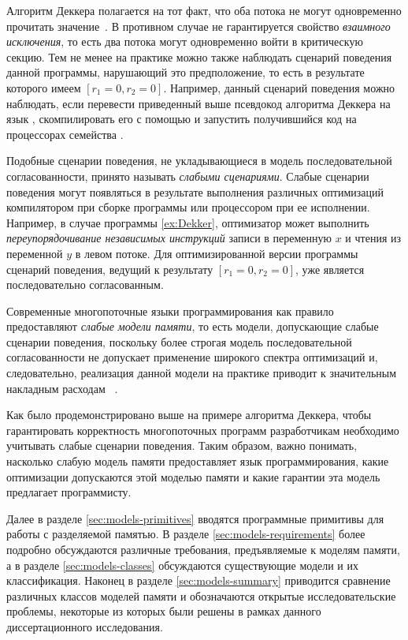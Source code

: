 Алгоритм Деккера полагается на тот факт, что оба 
потока не могут одновременно прочитать значение~.
В противном случае не гарантируется свойство \emph{взаимного исключения}, 
то есть два потока могут одновременно войти в критическую секцию. 
Тем не менее на практике можно также наблюдать
сценарий поведения данной программы, нарушающий это предположение, 
то есть в результате которого имеем ${[r_1=0,r_2=0]}$.
Например, данный сценарий поведения можно наблюдать,
если перевести приведенный выше псевдокод алгоритма Деккера
на язык \CLANG, скомпилировать его с помощью \GCC
и запустить получившийся код на процессорах семейства \IntelX.

Подобные сценарии поведения, 
не укладывающиеся в модель последовательной согласованности, 
принято называть \emph{слабыми сценариями}.
Слабые сценарии поведения могут появляться 
в результате выполнения различных оптимизаций 
компилятором при сборке программы или процессором при ее исполнении. 
Например, в случае программы \ref{ex:Dekker}, оптимизатор может выполнить 
\emph{переупорядочивание независимых инструкций} 
записи в переменную $x$ и чтения из переменной $y$ в левом потоке.
Для оптимизированной версии программы сценарий поведения, 
ведущий к результату ${[r_1=0, r_2=0]}$, уже является последовательно согласованным.

Современные многопоточные языки программирования 
как правило предоставляют \emph{слабые модели памяти},
то есть модели, допускающие слабые сценарии поведения,
поскольку более строгая модель последовательной согласованности
не допускает применение широкого спектра оптимизаций
и, следовательно, реализация данной модели на практике
приводит к значительным накладным расходам%
~\cite{Marino-al:PLDI11,Singh-al:ISCA12,Liu-al:OOPSLA17,Liu-al:PLDI19}. 

Как было продемонстрировано выше на примере алгоритма Деккера, 
чтобы гарантировать корректность многопоточных программ
разработчикам необходимо учитывать слабые сценарии поведения.
Таким образом, важно понимать, насколько слабую модель памяти
предоставляет язык программирования, какие оптимизации 
допускаются этой моделью памяти и какие гарантии 
эта модель предлагает программисту. 

Далее в разделе \ref{sec:models-primitives} 
вводятся программные примитивы для работы с разделяемой памятью. 
В разделе \ref{sec:models-requirements} более подробно обсуждаются 
различные требования, предъявляемые к моделям памяти, 
а в разделе \ref{sec:models-classes} обсуждаются существующие модели и их классификация. 
Наконец в разделе \ref{sec:models-summary} приводится сравнение различных 
классов моделей памяти и обозначаются открытые исследовательские проблемы, 
некоторые из которых были решены в рамках данного 
диссертационного исследования. 


